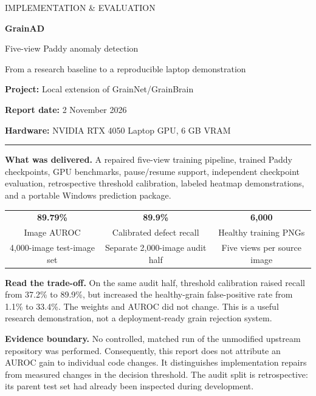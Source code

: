 \documentclass[11pt,a4paper]{article}
\begin{document}
\thispagestyle{empty}
{\color{teal}\large IMPLEMENTATION \& EVALUATION}\par
\vspace{7mm}
{\color{navy}\Huge\bfseries GrainAD}\par
{\color{navy}\LARGE Five-view Paddy anomaly detection}\par
\vspace{5mm}
{\large From a research baseline to a reproducible laptop demonstration}\par
\vspace{7mm}
\textbf{Project:} Local extension of GrainNet/GrainBrain\par
\textbf{Report date:} 2 November 2026\par
\textbf{Hardware:} NVIDIA RTX 4050 Laptop GPU, 6 GB VRAM\par
\vspace{5mm}
\hrule\vspace{4mm}
\textbf{What was delivered.} A repaired five-view training pipeline, trained Paddy checkpoints, GPU benchmarks, pause/resume support, independent checkpoint evaluation, retrospective threshold calibration, labeled heatmap demonstrations, and a portable Windows prediction package.

\begin{center}
\begin{tabular}{ccc}
\toprule
\textbf{89.79\%} & \textbf{89.9\%} & \textbf{6,000}\\
Image AUROC & Calibrated defect recall & Healthy training PNGs\\
4,000-image test-image set & Separate 2,000-image audit half & Five views per source image\\
\bottomrule
\end{tabular}
\end{center}

\textbf{Read the trade-off.} On the same audit half, threshold calibration raised recall from 37.2\% to 89.9\%, but increased the healthy-grain false-positive rate from 1.1\% to 33.4\%. The weights and AUROC did not change. This is a useful research demonstration, not a deployment-ready grain rejection system.

\textbf{Evidence boundary.} No controlled, matched run of the unmodified upstream repository was performed. Consequently, this report does not attribute an AUROC gain to individual code changes. It distinguishes implementation repairs from measured changes in the decision threshold. The audit split is retrospective: its parent test set had already been inspected during development.
\end{document}

